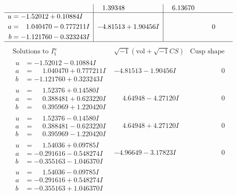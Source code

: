 \documentclass[1p]{elsarticle_modified}
\theoremstyle{definition}
\newcommand{\I}{\sqrt{-1}}
\begin{document}
$$\begin{array}{c|c|c}
 & \phantom{-}1.39348\phantom{ +0.000000I} & \phantom{-}6.13670\phantom{ +0.000000I} \\ \hline\begin{aligned}
u &= -1.52012 + 0.10884 I \\
a &= \phantom{-}1.040470 - 0.777211 I \\
b &= -1.121760 - 0.323243 I\end{aligned}
 & -4.81513 + 1.90456 I & \phantom{-0.000000 } 0\\
 \hline 
 \end{array}$$\newpage$$\begin{array}{c|c|c}  
\text{Solutions to }I^u_{1}& \I (\text{vol} + \sqrt{-1}CS) & \text{Cusp shape}\\
 \hline 
\begin{aligned}
u &= -1.52012 - 0.10884 I \\
a &= \phantom{-}1.040470 + 0.777211 I \\
b &= -1.121760 + 0.323243 I\end{aligned}
 & -4.81513 - 1.90456 I & \phantom{-0.000000 } 0 \\ \hline\begin{aligned}
u &= \phantom{-}1.52376 + 0.14580 I \\
a &= \phantom{-}0.388481 + 0.623220 I \\
b &= \phantom{-}0.395969 + 1.220420 I\end{aligned}
 & \phantom{-}4.64948 - 4.27120 I & \phantom{-0.000000 } 0 \\ \hline\begin{aligned}
u &= \phantom{-}1.52376 - 0.14580 I \\
a &= \phantom{-}0.388481 - 0.623220 I \\
b &= \phantom{-}0.395969 - 1.220420 I\end{aligned}
 & \phantom{-}4.64948 + 4.27120 I & \phantom{-0.000000 } 0 \\ \hline\begin{aligned}
u &= \phantom{-}1.54036 + 0.09785 I \\
a &= -0.291616 - 0.548274 I \\
b &= -0.355163 - 1.046370 I\end{aligned}
 & -4.96649 - 3.17823 I & \phantom{-0.000000 } 0 \\ \hline\begin{aligned}
u &= \phantom{-}1.54036 - 0.09785 I \\
a &= -0.291616 + 0.548274 I \\
b &= -0.355163 + 1.046370 I\end{aligned}

\end{array}$$
\end{document}
